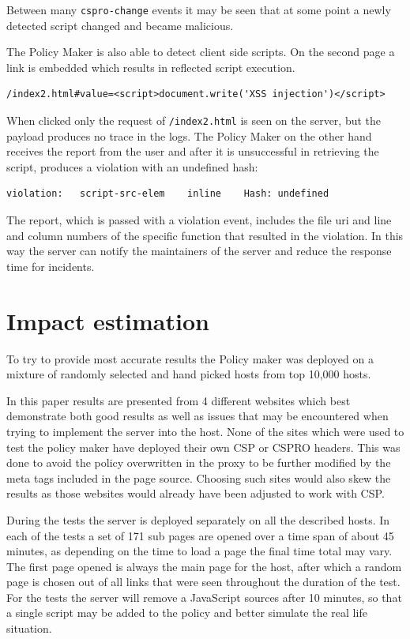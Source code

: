 Between many \texttt{cspro-change} events it may be seen that at some point a newly detected script changed and became malicious.

The Policy Maker is also able to detect client side scripts.
On the second page a link is embedded which results in reflected script execution.
\begin{verbatim}
/index2.html#value=<script>document.write('XSS injection')</script>
\end{verbatim}
When clicked only the request of \texttt{/index2.html} is seen on the server, but the payload produces no trace in the logs.
The Policy Maker on the other hand receives the report from the user and after it is unsuccessful in retrieving the script, produces a violation with an undefined hash:
\begin{verbatim}
violation:   script-src-elem    inline    Hash: undefined
\end{verbatim}
The report, which is passed with a violation event, includes the file uri and line and column numbers of the specific function that resulted in the violation.
In this way the server can notify the maintainers of the server and reduce the response time for incidents.

\section{Impact estimation}

To try to provide most accurate results the Policy maker was deployed on a mixture of randomly selected and hand picked hosts from top 10,000 hosts.

In this paper results are presented from 4 different websites which best demonstrate both good results as well as issues that may be encountered when trying to implement the server into the host.
None of the sites which were used to test the policy maker have deployed their own CSP or CSPRO headers.
This was done to avoid the policy overwritten in the proxy to be further modified by the meta tags included in the page source.
Choosing such sites would also skew the results as those websites would already have been adjusted to work with CSP.

During the tests the server is deployed separately on all the described hosts.
In each of the tests a set of 171 sub pages are opened over a time span of about 45 minutes, as depending on the time to load a page the final time total may vary. 
The first page opened is always the main page for the host, after which a random page is chosen out of all links that were seen throughout the duration of the test.
For the tests the server will remove a JavaScript sources after 10 minutes, so that a single script may be added to the policy and better simulate the real life situation.

